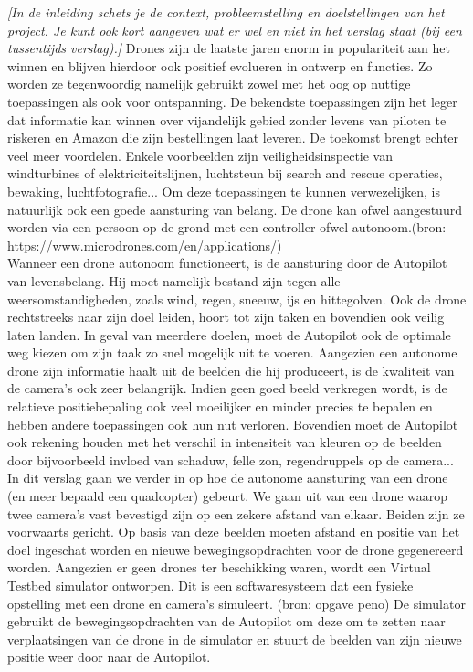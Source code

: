 \documentclass[tt]{penoverslag}
\begin{document}
\emph{[In de inleiding schets je de context, probleemstelling en doelstellingen van het project.  Je kunt ook kort aangeven wat er wel en niet in het verslag staat (bij een tussentijds verslag).]}
Drones zijn de laatste jaren enorm in populariteit aan het winnen en blijven hierdoor ook positief evolueren in ontwerp en functies. Zo worden ze tegenwoordig namelijk gebruikt zowel met het oog op nuttige toepassingen als ook voor ontspanning. De bekendste toepassingen zijn het leger dat informatie kan winnen over vijandelijk gebied zonder levens van piloten te riskeren en Amazon die zijn bestellingen laat leveren. De toekomst brengt echter veel meer voordelen. Enkele voorbeelden zijn veiligheidsinspectie van windturbines of elektriciteitslijnen, luchtsteun bij search and rescue operaties, bewaking, luchtfotografie... Om deze toepassingen te kunnen verwezelijken, is natuurlijk ook een goede aansturing van belang. De drone kan ofwel aangestuurd worden via een persoon op de grond met een controller ofwel autonoom.(bron: https://www.microdrones.com/en/applications/)\\

Wanneer een drone autonoom functioneert, is de aansturing door de Autopilot van levensbelang. Hij moet namelijk bestand zijn tegen alle weersomstandigheden, zoals wind, regen, sneeuw, ijs en hittegolven. Ook de drone rechtstreeks naar zijn doel leiden, hoort tot zijn taken en bovendien ook veilig laten landen. In geval van meerdere doelen, moet de Autopilot ook de optimale weg kiezen om zijn taak zo snel mogelijk uit te voeren. Aangezien een autonome drone zijn informatie haalt uit de beelden die hij produceert, is de kwaliteit van de camera's ook zeer belangrijk. Indien geen goed beeld verkregen wordt, is de relatieve positiebepaling ook veel moeilijker en minder precies te bepalen en hebben andere toepassingen ook hun nut verloren. Bovendien moet de Autopilot ook rekening houden met het verschil in intensiteit van kleuren op de beelden door bijvoorbeeld invloed van schaduw, felle zon, regendruppels op de camera...\\

In dit verslag gaan we verder in op hoe de autonome aansturing van een drone (en meer bepaald een quadcopter) gebeurt. We gaan uit van een drone waarop twee camera's vast bevestigd zijn op een zekere afstand van elkaar. Beiden zijn ze voorwaarts gericht. Op basis van deze beelden moeten afstand en positie van het doel ingeschat worden en nieuwe bewegingsopdrachten voor de drone gegenereerd worden. Aangezien er geen drones ter beschikking waren, wordt een Virtual Testbed simulator ontworpen. Dit is een softwaresysteem dat een fysieke opstelling met een drone en camera's simuleert. (bron: opgave peno) De simulator gebruikt de bewegingsopdrachten van de Autopilot om deze om te zetten naar verplaatsingen van de drone in de simulator en stuurt de beelden van zijn nieuwe positie weer door naar de Autopilot. \\
\end{document}
